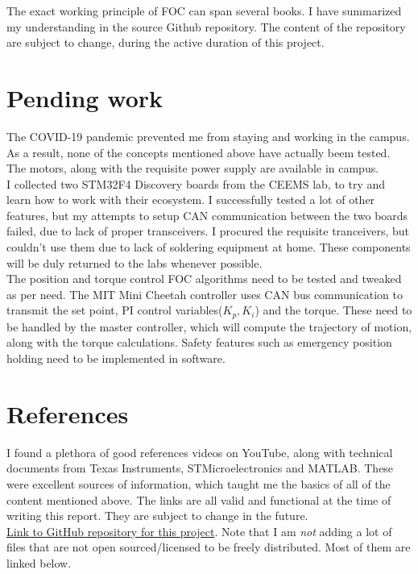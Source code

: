 \documentclass[a4paper]{article}
\begin{document}
		The exact working principle of FOC can span several books. I have summarized my understanding in the source Github repository. The content of the repository are subject to change, during the active duration of this project.

	\section{Pending work}
		The COVID-19 pandemic prevented me from staying and working in the campus. As a result, none of the concepts mentioned above have actually beem tested. The motors, along with the requisite power supply are available in campus.\\

		 I collected two STM32F4 Discovery boards from the CEEMS lab, to try and learn how to work with their ecosystem. I successfully tested a lot of other features, but my attempts to setup CAN communication between the two boards failed, due to lack of proper transceivers. I procured the requisite tranceivers, but couldn't use them due to lack of soldering equipment at home. These components will be duly returned to the labs whenever possible.\\

		 The position and torque control FOC algorithms need to be tested and tweaked as per need. The MIT Mini Cheetah controller uses CAN bus communication to transmit the set point, PI control variables($K_p, K_i$) and the torque. These need to be handled by the master controller, which will compute the trajectory of motion, along with the torque calculations. Safety features such as emergency position holding need to be implemented in software.

	\vspace*{1cm}
	\section{References}
		I found a plethora of good references videos on YouTube, along with technical documents from Texas Instruments, STMicroelectronics and MATLAB. These were excellent sources of information, which taught me the basics of all of the content mentioned above. The links are all valid and functional at the time of writing this report. They are subject to change in the future.\\

		\noindent\href{https://github.com/Shubhayu-Das/PE_6th_sem}{Link to GitHub repository for this project}. Note that I am \textit{not} adding a lot of files that are not open sourced/licensed to be freely distributed. Most of them are linked below.\\
\end{document}
